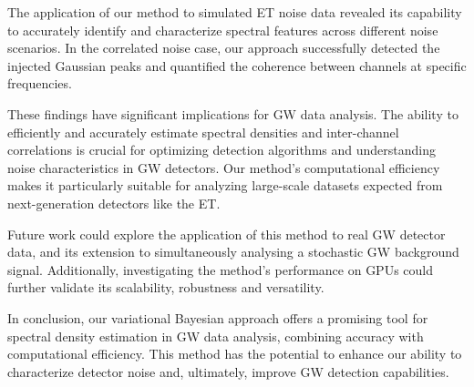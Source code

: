 \documentclass[%
 reprint,
 amsmath,amssymb,
 aps,
 nofootinbib,
]{revtex4-2}
\begin{document}
The application of our method to simulated ET noise data revealed its capability to accurately identify and characterize spectral features across different noise scenarios.
In the correlated noise case, our approach successfully detected the injected Gaussian peaks and quantified the coherence between channels at specific frequencies. 

These findings have significant implications for GW data analysis. The ability to efficiently and accurately estimate spectral densities and inter-channel correlations is crucial for optimizing detection algorithms and understanding noise characteristics in GW detectors. Our method's computational efficiency makes it particularly suitable for analyzing large-scale datasets expected from next-generation detectors like the ET.

Future work could explore the application of this method to real GW detector data, and its extension to simultaneously analysing a stochastic GW background signal. Additionally, investigating the method's performance on GPUs could further validate its scalability, robustness and versatility.

In conclusion, our variational Bayesian approach offers a promising tool for spectral density estimation in GW data analysis, combining accuracy with computational efficiency. This method has the potential to enhance our ability to characterize detector noise and, ultimately, improve GW detection capabilities.






\end{document}
